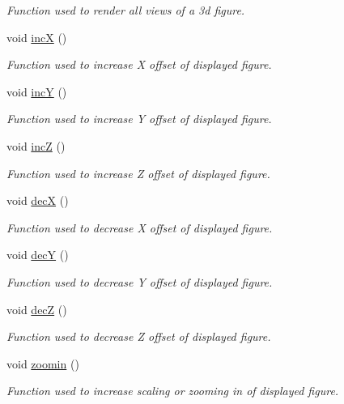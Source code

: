 \begin{DoxyCompactItemize}
\begin{DoxyCompactList}\small\item\em Function used to render all views of a 3d figure. \end{DoxyCompactList}\item 
void \hyperlink{classMainWindow_a6ae88293630f79a3ccb75bc5e64daea5}{incX} ()
\begin{DoxyCompactList}\small\item\em Function used to increase X offset of displayed figure. \end{DoxyCompactList}\item 
void \hyperlink{classMainWindow_ad4fa62f605231f2c935f37f7a204bbf9}{incY} ()
\begin{DoxyCompactList}\small\item\em Function used to increase Y offset of displayed figure. \end{DoxyCompactList}\item 
void \hyperlink{classMainWindow_a25ae6019ab87c5e9bf844ac007b00249}{incZ} ()
\begin{DoxyCompactList}\small\item\em Function used to increase Z offset of displayed figure. \end{DoxyCompactList}\item 
void \hyperlink{classMainWindow_a4c4ad4dbc9064c0bdbdb5f9ba619a6c2}{decX} ()
\begin{DoxyCompactList}\small\item\em Function used to decrease X offset of displayed figure. \end{DoxyCompactList}\item 
void \hyperlink{classMainWindow_aeab655f19703fca45999fc3cb11b6bd0}{decY} ()
\begin{DoxyCompactList}\small\item\em Function used to decrease Y offset of displayed figure. \end{DoxyCompactList}\item 
void \hyperlink{classMainWindow_a5841a993bb0167306794580058c435e2}{decZ} ()
\begin{DoxyCompactList}\small\item\em Function used to decrease Z offset of displayed figure. \end{DoxyCompactList}\item 
void \hyperlink{classMainWindow_a571790691bad25c9861c0c487ba0ce43}{zoomin} ()
\begin{DoxyCompactList}\small\item\em Function used to increase scaling or zooming in of displayed figure. \end{DoxyCompactList}\item 

\end{DoxyCompactItemize}
